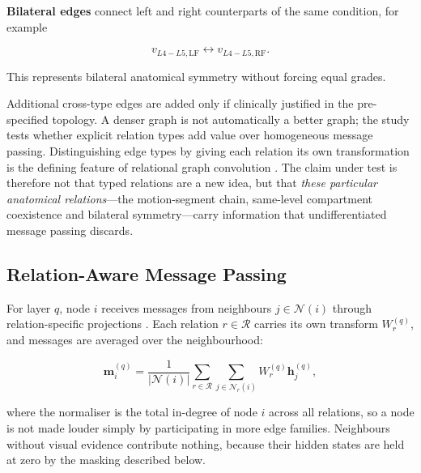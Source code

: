 \textbf{Bilateral edges} connect left and right counterparts of the same
condition, for example

\[
v_{L4-L5,\mathrm{LF}}
\leftrightarrow
v_{L4-L5,\mathrm{RF}}.
\]

This represents bilateral anatomical symmetry without forcing equal grades.

Additional cross-type edges are added only if clinically justified in the
pre-specified topology. A denser graph is not automatically a better graph; the
study tests whether explicit relation types add value over homogeneous message
passing. Distinguishing edge types by giving each relation its own
transformation is the defining feature of relational graph convolution
\cite{schlichtkrull2018modeling}. The claim under test is therefore not that
typed relations are a new idea, but that \emph{these particular anatomical
relations}---the motion-segment chain, same-level compartment coexistence and
bilateral symmetry---carry information that undifferentiated message passing
discards.

\subsection{Relation-Aware Message Passing}
\label{sec:method-message-passing}

For layer $q$, node $i$ receives messages from neighbours
$j\in\mathcal{N}(i)$ through relation-specific projections
\cite{schlichtkrull2018modeling}. Each relation $r\in\mathcal{R}$ carries its
own transform $W^{(q)}_r$, and messages are averaged over the neighbourhood:

\begin{equation}
\mathbf{m}^{(q)}_i
=
\frac{1}{|\mathcal{N}(i)|}
\sum_{r\in\mathcal{R}}
\sum_{j\in\mathcal{N}_r(i)}
W^{(q)}_r\mathbf{h}^{(q)}_j,
\label{eq:graph-message}
\end{equation}

where the normaliser is the total in-degree of node $i$ across all relations, so
a node is not made louder simply by participating in more edge families.
Neighbours without visual evidence contribute nothing, because their hidden
states are held at zero by the masking described below.

